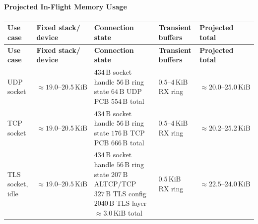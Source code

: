 \documentclass[titlepage]{report}
\begin{document}
			\paragraph{Projected In-Flight Memory Usage}
			{\footnotesize
			\begin{xltabular}{\textwidth}{@{}
				>{\raggedright\arraybackslash}p{0.18\textwidth}
				>{\raggedright\arraybackslash}X
				>{\raggedright\arraybackslash}X
				>{\raggedright\arraybackslash}X
				>{\raggedright\arraybackslash}X@{}}
				\toprule
				\textbf{Use case} & \parbox[t]{\linewidth}{\textbf{Fixed stack/}\\\textbf{device}} & \textbf{Connection state} & \parbox[t]{\linewidth}{\textbf{Transient}\\\textbf{buffers}} & \textbf{Projected total} \\
				\midrule
				\endfirsthead
				\toprule
				\textbf{Use case} & \parbox[t]{\linewidth}{\textbf{Fixed stack/}\\\textbf{device}} & \textbf{Connection state} & \parbox[t]{\linewidth}{\textbf{Transient}\\\textbf{buffers}} & \textbf{Projected total} \\
				\midrule
				\endhead
				\bottomrule
				\endfoot
				UDP socket &
				$\approx 19.0\text{--}20.5\,\text{KiB}$ &
				\parbox[t]{\linewidth}{$434\,\text{B}$ socket handle\\$56\,\text{B}$ ring state\\$64\,\text{B}$ UDP PCB\\$554\,\text{B}$ total} &
				$0.5\text{--}4\,\text{KiB}$ RX ring &
				$\approx 20.0\text{--}25.0\,\text{KiB}$ \\

				TCP socket &
				$\approx 19.0\text{--}20.5\,\text{KiB}$ &
				\parbox[t]{\linewidth}{$434\,\text{B}$ socket handle\\$56\,\text{B}$ ring state\\$176\,\text{B}$ TCP PCB\\$666\,\text{B}$ total} &
				$0.5\text{--}4\,\text{KiB}$ RX ring &
				$\approx 20.2\text{--}25.2\,\text{KiB}$ \\

				TLS socket, idle &
				$\approx 19.0\text{--}20.5\,\text{KiB}$ &
				\parbox[t]{\linewidth}{$434\,\text{B}$ socket handle\\$56\,\text{B}$ ring state\\$207\,\text{B}$ ALTCP/TCP\\$327\,\text{B}$ TLS config\\$2040\,\text{B}$ TLS layer\\$\approx 3.0\,\text{KiB}$ total} &
				$0.5\,\text{KiB}$ RX ring &
				$\approx 22.5\text{--}24.0\,\text{KiB}$ \\


\end{xltabular}}
\end{document}
